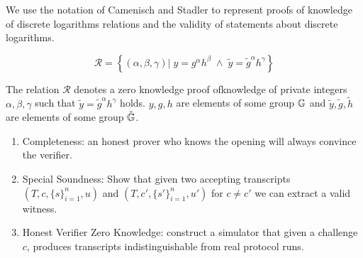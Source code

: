 {We use the notation of Camenisch and Stadler to represent proofs of knowledge of discrete logarithms relations and the validity of statements about discrete logarithms. 

\[
    \mathcal{R} = \left\{ (\alpha, \beta, \gamma) | \; y = g^{\alpha}h^{\beta} \; \wedge \; \tilde{y} = \tilde{g}^{\alpha}h^{\gamma} \right\}
\]

The relation $\mathcal{R}$ denotes a zero knowledge proof ofknowledge of private integers $\alpha, \beta, \gamma$ such that $\tilde{y} = \tilde{g}^{\alpha}h^{\gamma}$ holds. $y, g, h$ are elements of some group $\mathbb{G}$ and $\tilde{y}, \tilde{g}, \tilde{h}$ are elements of some group $\tilde{\mathbb{G}}$. 





\begin{enumerate}
    \item Completeness: an honest prover who knows the opening will always convince the verifier.
    
    \item Special Soundness: Show that given two accepting transcripts $(T, c, \{s\}_{i=1}^n, u)$ and $(T, c', \{s'\}_{i=1}^n, u')$ for $c \neq c'$ we can extract a valid witness.
    
    \item Honest Verifier Zero Knowledge: construct a simulator that given a challenge $c$, produces transcripts indistinguishable from real protocol runs.
\end{enumerate}



















}
